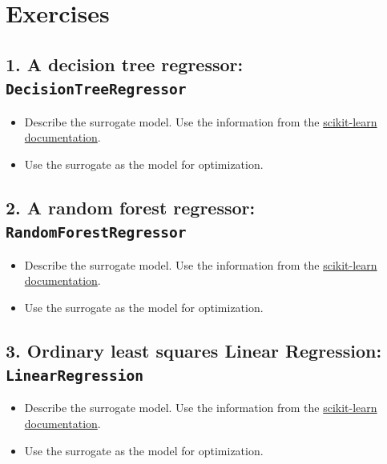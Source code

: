 \documentclass[
  letterpaper,
  DIV=11,
  numbers=noendperiod]{scrreprt}
\providecommand{\tightlist}{%
  \setlength{\itemsep}{0pt}\setlength{\parskip}{0pt}}\usepackage{longtable,booktabs,array}
\begin{document}
\section{Exercises}\label{exercises-4}

\subsection{\texorpdfstring{1. A decision tree regressor:
\texttt{DecisionTreeRegressor}}{1. A decision tree regressor: DecisionTreeRegressor}}\label{sec-10-exercise-01}

\begin{itemize}
\tightlist
\item
  Describe the surrogate model. Use the information from the
  \href{https://scikit-learn.org/stable/modules/generated/sklearn.tree.DecisionTreeRegressor.html}{scikit-learn
  documentation}.
\item
  Use the surrogate as the model for optimization.
\end{itemize}

\subsection{\texorpdfstring{2. A random forest regressor:
\texttt{RandomForestRegressor}}{2. A random forest regressor: RandomForestRegressor}}\label{sec-10-exercise-02}

\begin{itemize}
\tightlist
\item
  Describe the surrogate model. Use the information from the
  \href{https://scikit-learn.org/stable/modules/generated/sklearn.ensemble.RandomForestRegressor.html}{scikit-learn
  documentation}.
\item
  Use the surrogate as the model for optimization.
\end{itemize}

\subsection{\texorpdfstring{3. Ordinary least squares Linear Regression:
\texttt{LinearRegression}}{3. Ordinary least squares Linear Regression: LinearRegression}}\label{sec-10-exercise-03}

\begin{itemize}
\tightlist
\item
  Describe the surrogate model. Use the information from the
  \href{https://scikit-learn.org/stable/modules/generated/sklearn.linear_model.LinearRegression.html}{scikit-learn
  documentation}.
\item
  Use the surrogate as the model for optimization.
\end{itemize}
\end{document}
